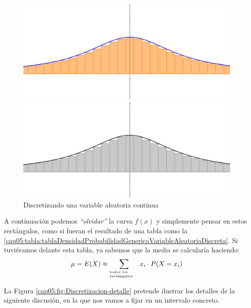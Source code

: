 \begin{figure}[htbp]
\begin{center}
\begin{enColor}
\includegraphics[width=12cm]{../fig/Cap05-Discretizacion.png}
\end{enColor}
\begin{bn}
\includegraphics[width=12cm]{../fig/Cap05-Discretizacion-bn.png}
\end{bn}
\caption{Discretizando una variable aleatoria continua}
\label{cap05:fig:Discretizacion}
\end{center}
\end{figure}

A continuación podemos {\em ``olvidar''} la curva $f(x)$ y simplemente pensar en estos rectángulos, como si fueran el resultado de una tabla como la \ref{cap05:tabla:tablaDensidadProbabilidadGenericaVariableAleatoriaDiscreta}. Si tuviéramos delante esta tabla, ya sabemos que la media se calcularía haciendo:
   \begin{equation}\label{cap05:ecu:ArgumentacionMediaVariableContinua}
   \mu=E(X)\approx \sum_{\begin{minipage}{1.5cm}\tiny todos los\\ rectángulos\end{minipage}}x_i\cdot P(X=x_i)
   \end{equation}

La Figura \ref{cap05:fig:Discretizacion-detalle} pretende ilustrar los detalles de la siguiente discusión, en la que nos vamos a fijar en un intervalo concreto.

